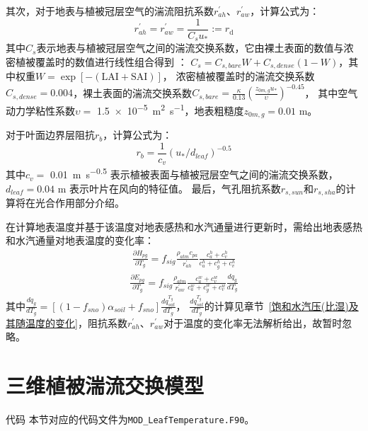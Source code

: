 其次，对于地表与植被冠层空气的湍流阻抗系数$r_{ah}^\prime$、$r_{aw}^\prime$，计算公式为：
\begin{equation}
r_{a h}^{\prime}=r_{a w}^{\prime}=\frac{1}{C_{s} u_{*}}:=r_{\mathrm{d}}
\end{equation}
其中$C_s$表示地表与植被冠层空气之间的湍流交换系数，它由裸土表面的数值与浓密植被覆盖时的数值进行线性组合得到 \citep{zeng2005vegetation}：
$C_s=C_{s,bare}W+C_{s,dense}\left(1-W\right)$，其中权重$W=\exp {\left[-(\text{LAI}+\text{SAI})\right]}$，
浓密植被覆盖时的湍流交换系数$C_{s,dense}=0.004$，裸土表面的湍流交换系数$C_{s,bare}=\frac{\kappa}{0.13}\left(\frac{z_{0m,g}u_\ast}{\upsilon}\right)^{-0.45}$，
其中空气动力学粘性系数$\upsilon=$ \qty{1.5e-5}{m^2.s^{-1}}，地表粗糙度$z_{0m,g}=0.01$ {m}。

对于叶面边界层阻抗$r_b$，计算公式为：
\begin{equation}
r_{b}=\frac{1}{c_{v}}\left(u_{*} / d_{{leaf }}\right)^{-0.5}
\end{equation}
其中$c_v=$ \qty{0.01}{m.s^{-0.5}} 表示植被表面与植被冠层空气之间的湍流交换系数，$d_{leaf}=0.04$ m 表示叶片在风向的特征值。
最后，气孔阻抗系数$r_{s,sun}$和$r_{s,sha}$的计算将在光合作用部分介绍。

在计算地表温度并基于该温度对地表感热和水汽通量进行更新时，需给出地表感热和水汽通量对地表温度的变化率：
\begin{equation}
\begin{array}{c} \frac{\partial H_{p g}}{\partial T_{g}}=f_{sig} \frac{\rho_{atm} c_{p a}}{r_{a h}^{\prime}} 
     \frac{c_{a}^{h}+c_{v}^{h}}{c_{a}^{h}+c_{g}^{h}+c_{v}^{h}}\end{array}
\end{equation}
\begin{equation}
\begin{array}{c}\frac{\partial E_{p g}}{\partial T_{g}}=f_{sig}
      \frac{\rho_{atm}}{r_{a w}^{\prime}} \frac{c_{a}^{w}+c_{v}^{w}}{c_{a}^{w}+c_{g}^{w}+c_{v}^{w}} \frac{d q_{g}}{d T_{g}}\end{array}
\end{equation}
其中$\frac{dq_g}{dT_g}=\left[\left(1-f_{sno}\right)\alpha_{soil}+f_{sno}\right]\frac{dq_{sat}^{T_g}}{dT_g}$，
$\frac{dq_{sat}^{T_g}}{dT_g}$的计算见章节~\ref{饱和水汽压(比湿)及其随温度的变化}，阻抗系数$r_{ah}^\prime$、$r_{aw}^\prime$对于温度的变化率无法解析给出，故暂时忽略。


\section{三维植被湍流交换模型}
\begin{mymdframed}{代码}
本节对应的代码文件为\texttt{MOD\_LeafTemperature.F90}。
\end{mymdframed}

